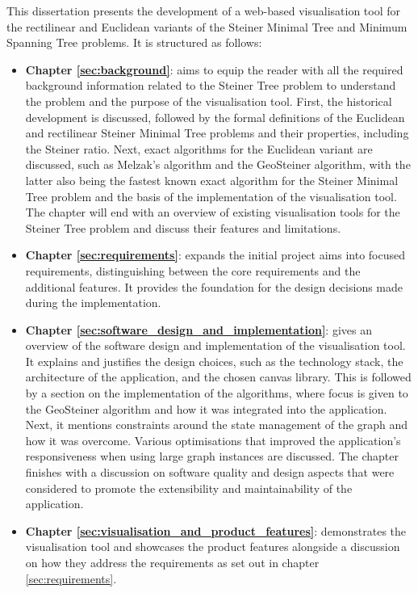 \documentclass{l4proj}
\begin{document}
This dissertation presents the development of a web-based visualisation tool for the rectilinear and Euclidean variants of the Steiner Minimal Tree and Minimum Spanning Tree problems. It is structured as follows:
\begin{itemize}
    \item \textbf{Chapter \ref{sec:background}}: aims to equip the reader with all the required background information related to the Steiner Tree problem to understand the problem and the purpose of the visualisation tool. First, the historical development is discussed, followed by the formal definitions of the Euclidean and rectilinear Steiner Minimal Tree problems and their properties, including the Steiner ratio. Next, exact algorithms for the Euclidean variant are discussed, such as Melzak's algorithm and the GeoSteiner algorithm, with the latter also being the fastest known exact algorithm for the Steiner Minimal Tree problem and the basis of the implementation of the visualisation tool. The chapter will end with an overview of existing visualisation tools for the Steiner Tree problem and discuss their features and limitations.
    \item \textbf{Chapter \ref{sec:requirements}}: expands the initial project aims into focused requirements, distinguishing between the core requirements and the additional features. It provides the foundation for the design decisions made during the implementation.
    \item \textbf{Chapter \ref{sec:software_design_and_implementation}}: gives an overview of the software design and implementation of the visualisation tool. It explains and justifies the design choices, such as the technology stack, the architecture of the application, and the chosen canvas library. This is followed by a section on the implementation of the algorithms, where focus is given to the GeoSteiner algorithm and how it was integrated into the application. Next, it mentions constraints around the state management of the graph and how it was overcome. Various optimisations that improved the application's responsiveness when using large graph instances are discussed. The chapter finishes with a discussion on software quality and design aspects that were considered to promote the extensibility and maintainability of the application.
    \item \textbf{Chapter \ref{sec:visualisation_and_product_features}}: demonstrates the visualisation tool and showcases the product features alongside a discussion on how they address the requirements as set out in chapter \ref{sec:requirements}.

\end{itemize}
\end{document}

